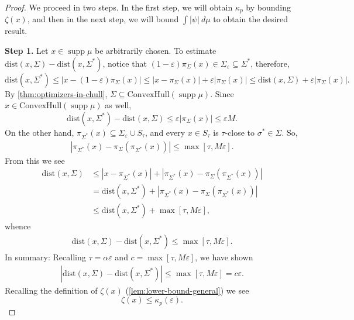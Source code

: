 \documentclass[preprint, reqno]{amsart}
\DeclareMathOperator*{\supp}{supp}
\renewcommand{\epsilon}{\varepsilon}
\renewcommand{\subset}{\subseteq}
\newcommand{\dist}{\mathrm{dist}}
\theoremstyle{definition}
\numberwithin{equation}{section}
\begin{document}
\begin{proof}
  We proceed in two steps. In the first step, we will obtain
  $\kappa_p$ by bounding $\zeta(x)$, and then in the next step, we
  will bound $\int |\psi|\ d \mu$ to obtain the desired result.

  \textbf{Step 1.} Let $x \in \supp \mu$ be arbitrarily chosen. To
  estimate $\dist(x, \Sigma) - \dist(x, \Sigma^*)$, notice that
  $(1-\epsilon) \pi_\Sigma(x) \in \Sigma_\epsilon \subset \Sigma^*$,
  therefore,
  \[
    \dist(x, \Sigma^*) \le |x- (1-\epsilon)\pi_\Sigma (x) | \le |x
    -\pi_\Sigma (x)| + \epsilon|\pi_\Sigma (x)| \le \dist(x, \Sigma) +
    \epsilon|\pi_\Sigma (x)|.
  \]
  By \cref{thm:optimizers-in-chull}, $\Sigma \subseteq
  \mathrm{ConvexHull}(\supp \mu)$. Since $x \in
  \mathrm{ConvexHull}(\supp \mu)$ as well,
  \[
    \dist(x, \Sigma^*)- \dist(x, \Sigma) \le \epsilon|\pi_\Sigma
    (x)|\le \epsilon M.
  \]
  On the other hand, $\pi_{\Sigma^*} (x) \subset \Sigma_\epsilon \cup
  S_\tau$, and every $x \in S_\tau$ is $\tau$-close to $\sigma^* \in
  \Sigma$. So,
  \begin{align*}
    |\pi_{\Sigma^*}(x) - \pi_\Sigma (\pi_{\Sigma^*}(x))| \le
    \max[\tau, M\epsilon].
  \end{align*}
  From this we see
  \begin{align*}
    \dist (x, \Sigma)
    & \le |x-\pi_{\Sigma^*}(x)| + | \pi_{\Sigma^*}(x) -
      \pi_\Sigma(\pi_{\Sigma^*}(x))| \\
    &= \dist(x, \Sigma^*) +| \pi_{\Sigma^*}(x) -
      \pi_\Sigma(\pi_{\Sigma^*}(x))|\\
    & \le \dist(x, \Sigma^*) + \max[\tau, M\epsilon],
  \end{align*}
  whence
  \begin{align*}
    \dist (x, \Sigma) - \dist(x, \Sigma^*) \le \max[\tau, M\epsilon].
  \end{align*}
  In summary: Recalling $\tau = \alpha \epsilon$ and $c = \max[\tau,
  M\epsilon]$, we have shown
  \begin{align*}
    |\dist (x, \Sigma) - \dist(x, \Sigma^*)| \le \max[\tau, M\epsilon]=
    c \epsilon.
  \end{align*}
  Recalling the definition of $\zeta(x)$
  (\cref{lem:lower-bound-general}) we see
  \begin{equation}
    \zeta(x) \leq \kappa_p(\epsilon). \label{eq:zeta-kappa-ineq}
  \end{equation}



\end{proof}
\end{document}
